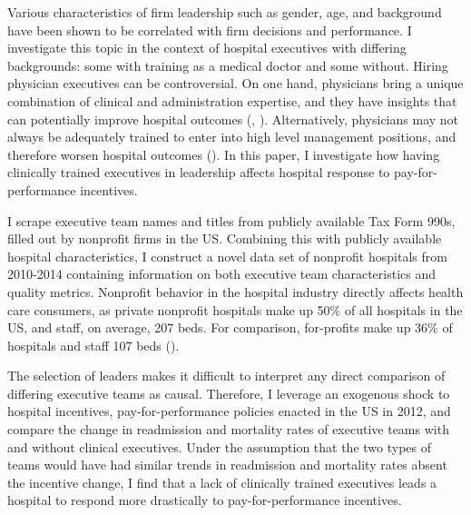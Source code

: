 \documentclass[12pt]{article}
\begin{document}
	\onehalfspacing
	
	\newpage

    Various characteristics of firm leadership such as gender, age, and background have been shown to be correlated with firm decisions and performance. I investigate this topic in the context of hospital executives with differing backgrounds: some with training as a medical doctor and some without. Hiring physician executives can be controversial. On one hand, physicians bring a unique combination of clinical and administration expertise, and they have insights that can potentially improve hospital outcomes (\cite{Stajduhar_2023}, \cite{Ahmed_2022}). Alternatively, physicians may not always be adequately trained to enter into high level management positions, and therefore worsen hospital outcomes (\cite{HarvardBusinessReview2018}). In this paper, I investigate how having clinically trained executives in leadership affects hospital response to pay-for-performance incentives.  

    I scrape executive team names and titles from publicly available Tax Form 990s, filled out by nonprofit firms in the US. Combining this with publicly available hospital characteristics, I construct a novel data set of nonprofit hospitals from 2010-2014 containing information on both executive team characteristics and quality metrics. Nonprofit behavior in the hospital industry directly affects health care consumers, as private nonprofit hospitals make up 50\% of all hospitals in the US, and staff, on average, 207 beds. For comparison, for-profits make up 36\% of hospitals and staff 107 beds (\cite{ASPE_2023}). 
    
    The selection of leaders makes it difficult to interpret any direct comparison of differing executive teams as causal. Therefore, I leverage an exogenous shock to hospital incentives, pay-for-performance policies enacted in the US in 2012, and compare the change in readmission and mortality rates of executive teams with and without clinical executives. Under the assumption that the two types of teams would have had similar trends in readmission and mortality rates absent the incentive change, I find that a lack of clinically trained executives leads a hospital to respond more drastically to pay-for-performance incentives. 
    
\end{document}

